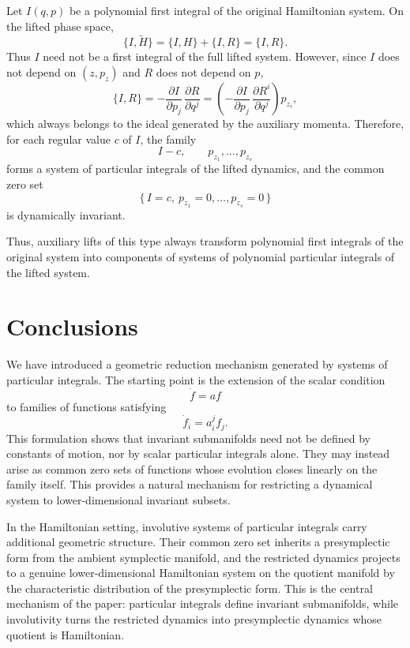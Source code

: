 \documentclass[10pt,a4paper]{article}
\begin{document}
Let \(I(q,p)\) be a polynomial first integral of the original Hamiltonian system. On the lifted phase space,
\[
\{I,\widetilde H\}
=
\{I,H\}+\{I,R\}
=
\{I,R\}.
\]
Thus $I$ need not be a first integral of the full lifted system. However,
since $I$ does not depend on $(z, p_z)$ and $R$ does not depend on $p$,
\begin{equation*}
\{I, R\}
= -\frac{\partial I}{\partial p_j}\,\frac{\partial R}{\partial q^j}
= \left(-\frac{\partial I}{\partial p_j}\,\frac{\partial R^i}{\partial q^j}\right) p_{z_i},
\end{equation*}
which always belongs to the ideal generated by the auxiliary momenta.
Therefore, for each regular value $c$ of $I$, the family
\begin{equation*}
I - c, \qquad p_{z_1}, \ldots, p_{z_s}
\end{equation*}
forms a system of particular integrals of the lifted dynamics, and the common
zero set
\begin{equation*}
\{\, I = c,\ p_{z_1} = 0, \ldots, p_{z_s} = 0 \,\}
\end{equation*}
is dynamically invariant.

Thus, auxiliary lifts of this type always transform polynomial first
integrals of the original system into components of systems of polynomial particular integrals of the lifted system.





\section{Conclusions}

We have introduced a geometric reduction mechanism generated by systems of particular integrals. The starting point is the extension of the scalar condition
\[
\dot f=af
\]
to families of functions satisfying
\[
\dot f_i=a_i^j f_j .
\]
This formulation shows that invariant submanifolds need not be defined by constants of motion, nor by scalar particular integrals alone. They may instead arise as common zero sets of functions whose evolution closes linearly on the family itself. This provides a natural mechanism for restricting a dynamical system to lower-dimensional invariant subsets.

In the Hamiltonian setting, involutive systems of particular integrals carry additional geometric structure. Their common zero set inherits a presymplectic form from the ambient symplectic manifold, and the restricted dynamics projects to a genuine lower-dimensional Hamiltonian system on the quotient manifold by the characteristic distribution of the presymplectic form. This is the central mechanism of the paper: particular integrals define invariant submanifolds, while involutivity turns the restricted dynamics into presymplectic dynamics whose quotient is Hamiltonian.
\end{document}
